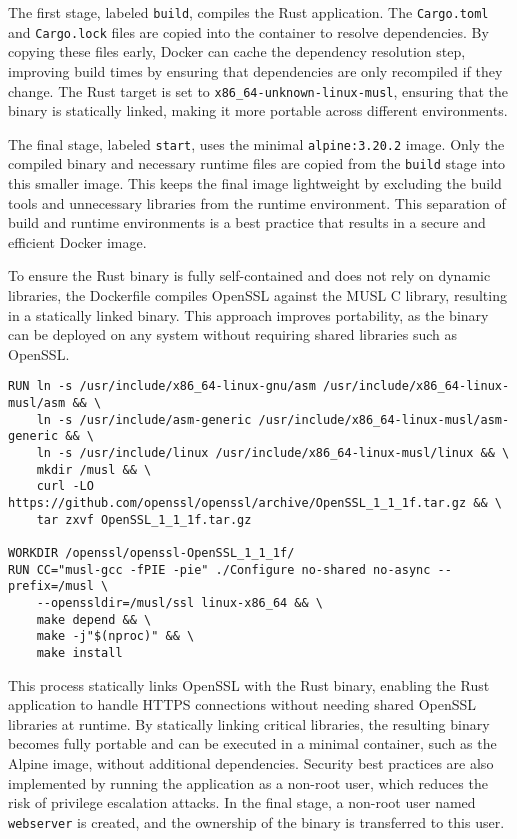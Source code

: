 The first stage, labeled \texttt{build}, compiles the Rust application. The
\texttt{Cargo.toml} and \texttt{Cargo.lock} files are copied into the container to
resolve dependencies. By copying these files early, Docker can cache the dependency
resolution step, improving build times by ensuring that dependencies are only
recompiled if they change. The Rust target is set to \texttt{x86\_64-unknown-linux-musl},
ensuring that the binary is statically linked, making it more portable across different
environments.

The final stage, labeled \texttt{start}, uses the minimal \texttt{alpine:3.20.2} image.
Only the compiled binary and necessary runtime files are copied from the \texttt{build}
stage into this smaller image. This keeps the final image lightweight by excluding
the build tools and unnecessary libraries from the runtime environment. This separation
of build and runtime environments is a best practice that results in a secure and
efficient Docker image.

To ensure the Rust binary is fully self-contained and does not rely on dynamic libraries,
the Dockerfile compiles OpenSSL against the MUSL C library, resulting in a statically
linked binary. This approach improves portability, as the binary can be deployed on any
system without requiring shared libraries such as OpenSSL.

\begin{lstlisting}[caption={OpenSSL Compilation with MUSL}]
RUN ln -s /usr/include/x86_64-linux-gnu/asm /usr/include/x86_64-linux-musl/asm && \
    ln -s /usr/include/asm-generic /usr/include/x86_64-linux-musl/asm-generic && \
    ln -s /usr/include/linux /usr/include/x86_64-linux-musl/linux && \
    mkdir /musl && \
    curl -LO https://github.com/openssl/openssl/archive/OpenSSL_1_1_1f.tar.gz && \
    tar zxvf OpenSSL_1_1_1f.tar.gz

WORKDIR /openssl/openssl-OpenSSL_1_1_1f/
RUN CC="musl-gcc -fPIE -pie" ./Configure no-shared no-async --prefix=/musl \
    --openssldir=/musl/ssl linux-x86_64 && \
    make depend && \
    make -j"$(nproc)" && \
    make install
\end{lstlisting}

This process statically links OpenSSL with the Rust binary, enabling the Rust
application to handle HTTPS connections without needing shared OpenSSL libraries at
runtime. By statically linking critical libraries, the resulting binary becomes
fully portable and can be executed in a minimal container, such as the Alpine image,
without additional dependencies.
Security best practices are also implemented by running the application as a non-root
user, which reduces the risk of privilege escalation attacks. In the final stage,
a non-root user named \texttt{webserver} is created, and the ownership of the binary
is transferred to this user.

